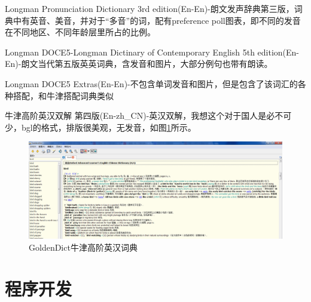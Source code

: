 \documentclass[paper=a4,fontsize=11pt]{article}
\begin{document}
	Longman Pronunciation Dictionary 3rd edition(En-En)-朗文发声辞典第三版，词典中有英音、美音，并对于“多音”的词，配有preference poll图表，即不同的发音在不同地区、不同年龄层里所占的比例。  
	
	Longman DOCE5-Longman Dictinary of Contemporary English 5th edition(En-En)-朗文当代第五版英英词典，含发音和图片，大部分例句也带有朗读。  
	
	Longman DOCE5 Extras(En-En)-不包含单词发音和图片，但是包含了该词汇的各种搭配，和牛津搭配词典类似
	
	牛津高阶英汉双解 第四版(En-zh\_CN)-英汉双解，我想这个对于国人是必不可少，bgl的格式，排版很美观，无发音，如图\ref{GoldenDictOxford}所示。   
	
	\begin{figure}[htbp]
		\centering
		\includegraphics[scale=0.35]{GoldenDictOxford.jpg}
		\caption{GoldenDict牛津高阶英汉词典}
		\label{GoldenDictOxford}
	\end{figure}
	
	\clearpage
		
	\part{程序开发}	
	
	\clearpage
	
\end{document}
